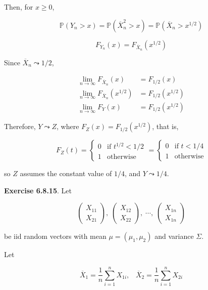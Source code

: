 Then, for \(x \geq 0\),

\[\mathbb{P}(Y_n > x) = \mathbb{P}(\overline{X}_n^2 > x) = \mathbb{P}(\overline{X}_n > x^{1/2})\]

\[F_{Y_n}(x) = F_{\overline{X}_n}(x^{1/2}) \]

Since \(\overline{X}_n \leadsto 1/2\),

\begin{align}
\lim _{n \rightarrow \infty} F_{\overline{X}_n}(x) & = F_{1/2}(x) \\
\lim _{n \rightarrow \infty} F_{\overline{X}_n}(x^{1/2}) & = F_{1/2}(x^{1/2}) \\
\lim _{n \rightarrow \infty} F_{Y}(x) & = F_{1/2}(x^{1/2})
\end{align}

Therefore, \(Y \leadsto Z\), where \(F_Z(x) = F_{1/2}(x^{1/2})\), that
is,

\[
\begin{equation}
  F_Z(t) =
    \begin{cases}
      0   & \text{if } t^{1/2} < 1/2 \\
      1 & \text{otherwise}
    \end{cases}   
  = \begin{cases}
      0   & \text{if } t < 1/4 \\
      1 & \text{otherwise}
    \end{cases} 
\end{equation}
\]

so \(Z\) assumes the constant value of \(1/4\), and \(Y \leadsto 1/4\).

\textbf{Exercise 6.8.15}. Let

\[ 
\begin{pmatrix} X_{11} \\ X_{21} \end{pmatrix}, \;
\begin{pmatrix} X_{12} \\ X_{22} \end{pmatrix}, \;
\cdots, \;
\begin{pmatrix} X_{1n} \\ X_{1n} \end{pmatrix}
\]

be iid random vectors with mean \(\mu = (\mu_1, \mu_2)\) and variance
\(\Sigma\).

Let

\[
\overline{X}_1 = \frac{1}{n}\sum_{i=1}^n X_{1i}, \; \; \;
\overline{X}_2 = \frac{1}{n}\sum_{i=1}^n X_{2i}
\]

